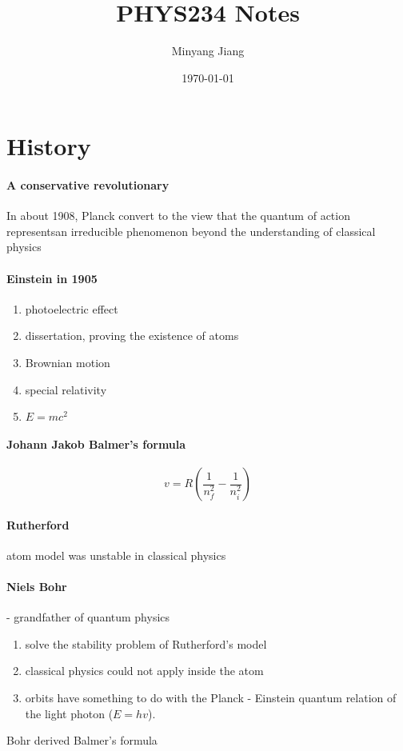 \documentclass[12pt, a4paper]{article}
\title{\huge PHYS234 Notes}
\author{Minyang Jiang}
\date{\today}
\newcommand{\NP}{\newpage \vspace*{-0.4in}}
\begin{document}
\maketitle

\NP
\section{History}
\paragraph{A conservative revolutionary}
In about 1908, Planck convert to the view that the quantum of action representsan irreducible phenomenon beyond the understanding of classical physics
\paragraph{Einstein in 1905}
\begin{enumerate}
\item photoelectric effect
\item dissertation, proving the existence of atoms
\item Brownian motion
\item special relativity
\item $E=mc^2$
\end{enumerate}
\paragraph{Johann Jakob Balmer's formula}
$$v=R\left(\frac{1}{n_f^2}-\frac{1}{n_i^2}\right)$$
\paragraph{Rutherford}
atom model was unstable in classical physics
\paragraph{Niels Bohr}
- grandfather of quantum physics
\begin{enumerate}
\item solve the stability problem of Rutherford's model
\item classical physics could not apply inside the atom
\item orbits have something to do with the Planck - Einstein quantum relation of the light photon ($E=hv$).
\end{enumerate}
Bohr derived Balmer's formula
\end{document}
